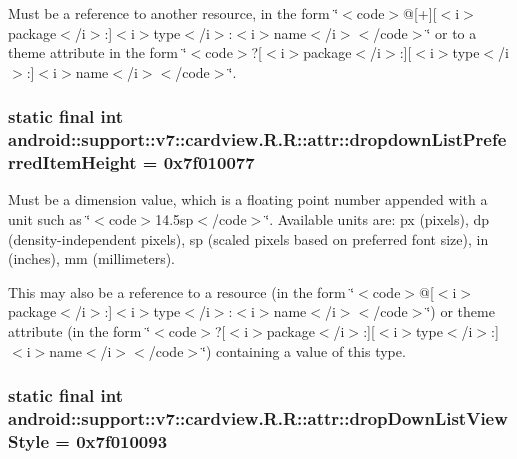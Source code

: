 Must be a reference to another resource, in the form \char`\"{}$<$code$>$@\mbox{[}+\mbox{]}\mbox{[}$<$i$>$package$<$/i$>$:\mbox{]}$<$i$>$type$<$/i$>$:$<$i$>$name$<$/i$>$$<$/code$>$\char`\"{} or to a theme attribute in the form \char`\"{}$<$code$>$?\mbox{[}$<$i$>$package$<$/i$>$:\mbox{]}\mbox{[}$<$i$>$type$<$/i$>$:\mbox{]}$<$i$>$name$<$/i$>$$<$/code$>$\char`\"{}. \hypertarget{classandroid_1_1support_1_1v7_1_1cardview_1_1_r_1_1attr_c065005c6740cb08ecc0b15e39fc6b56}{
\subsubsection[{dropdownListPreferredItemHeight}]{\setlength{\rightskip}{0pt plus 5cm}static final int android::support::v7::cardview.R.R::attr::dropdownListPreferredItemHeight = 0x7f010077}}
\label{classandroid_1_1support_1_1v7_1_1cardview_1_1_r_1_1attr_c065005c6740cb08ecc0b15e39fc6b56}


Must be a dimension value, which is a floating point number appended with a unit such as \char`\"{}$<$code$>$14.5sp$<$/code$>$\char`\"{}. Available units are: px (pixels), dp (density-independent pixels), sp (scaled pixels based on preferred font size), in (inches), mm (millimeters). 

This may also be a reference to a resource (in the form \char`\"{}$<$code$>$@\mbox{[}$<$i$>$package$<$/i$>$:\mbox{]}$<$i$>$type$<$/i$>$:$<$i$>$name$<$/i$>$$<$/code$>$\char`\"{}) or theme attribute (in the form \char`\"{}$<$code$>$?\mbox{[}$<$i$>$package$<$/i$>$:\mbox{]}\mbox{[}$<$i$>$type$<$/i$>$:\mbox{]}$<$i$>$name$<$/i$>$$<$/code$>$\char`\"{}) containing a value of this type. \hypertarget{classandroid_1_1support_1_1v7_1_1cardview_1_1_r_1_1attr_0eca60ae28d36f8480b2c34ef79c4d2d}{
\subsubsection[{dropDownListViewStyle}]{\setlength{\rightskip}{0pt plus 5cm}static final int android::support::v7::cardview.R.R::attr::dropDownListViewStyle = 0x7f010093}}
\label{classandroid_1_1support_1_1v7_1_1cardview_1_1_r_1_1attr_0eca60ae28d36f8480b2c34ef79c4d2d}



